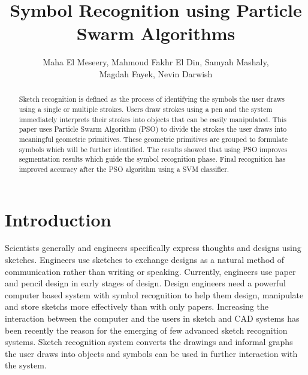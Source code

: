 \documentclass[a4paper,10pt]{IEEEconf}
\title{ Symbol Recognition using Particle Swarm Algorithms}
\author{Maha El Meseery,  Mahmoud Fakhr El Din,  Samyah Mashaly,
\\  Magdah Fayek,  Nevin Darwish}
\begin{document}
\maketitle
\begin{abstract}
Sketch recognition is defined as the process of identifying the symbols the user draws using a single or multiple strokes. Users draw strokes using a pen and the system immediately interprets their strokes into objects that can be easily manipulated. This paper uses Particle Swarm Algorithm (PSO) to divide the strokes the user draws into meaningful geometric primitives. These geometric primitives are grouped to formulate symbols which will be further identified. The results showed that using PSO improves segmentation results which guide the symbol recognition phase. Final recognition has improved accuracy after the PSO algorithm using a SVM classifier.  
\end{abstract}
\section{Introduction}
Scientists generally and engineers specifically express thoughts and designs using sketches. Engineers use sketches to exchange designs as a natural method of communication rather than writing or speaking. Currently, engineers use paper and pencil design in early stages of design. Design engineers need a powerful computer based system with symbol recognition to help them design, manipulate and store sketchs more effectively than with only papers.  Increasing the interaction between the computer and the users in sketch and CAD systems has been recently the reason for the emerging of few advanced sketch recognition systems. Sketch recognition system converts the drawings and informal graphs the user draws into objects and symbols can be used in further interaction with the system. 
\end{document}
